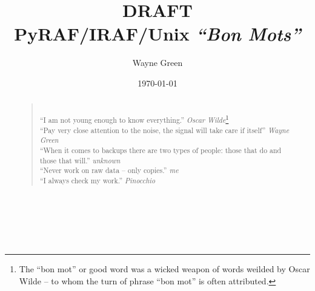 \documentclass[letter,11pt,oneside]{article}
\begin{document}
\setlength{\footskip}{13.59999pt}


\pagecolor{yellow}
\vspace{-2.5cm}
\title{\vspace{2.0cm}
{\huge DRAFT} \\
PyRAF/IRAF/Unix \emph{``Bon Mots''}\\
{\color{darkred}{Now! With Official 2.18 and PyRAF 3}}}
\author{\vspace{-0.5cm} Wayne Green}
\date{\vspace{-0.5cm} \today}
\maketitle

\begin{abstract}
{\color{darkgreen}
\begin{quote}
~\\
``I am not young enough to know everything.'' {\small \emph{Oscar
    Wilde}\footnote{The ``bon mot'' or good word was a wicked weapon
of words weilded by Oscar Wilde -- to whom the turn of phrase ``bon
mot'' is often attributed.}}
\\
``Pay very close attention to the noise, the signal will take care if itself''
{\small \emph{Wayne Green}}
\\
``When it comes to backups there are two types of people: those that do
and those that will.'' {\small \emph{unknown}}
\\
``Never work on raw data -- only copies.'' {\small \emph{me}}
\\
``I always check my work.'' {\small \emph{Pinocchio}}
\end{quote}
}
\end{abstract}
\clearpage
\pagecolor{white}




\section*{~} \label{sec:contents}
\tableofcontents
\listoftables
\end{document}
